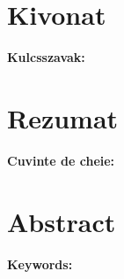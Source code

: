 
\hungarianParagraph


\chapter*{Kivonat}


\vspace*{2cm}

\noindent \textbf{Kulcsszavak:} 
\vfill
{}

\chapter*{Rezumat}


\vspace*{2cm}


\noindent \textbf{Cuvinte de cheie:} 

\vfill
{}

\chapter*{Abstract}



\vspace*{2cm}

\noindent \textbf{Keywords:} 

\vfill
\dolgozatnyelve
{}